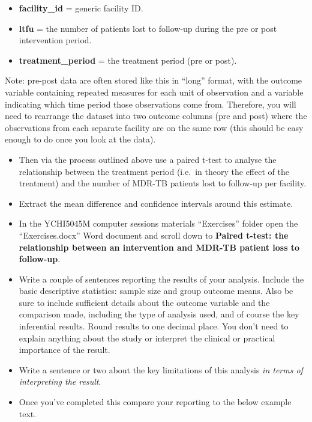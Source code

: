 \documentclass[
]{book}
\begin{document}
\begin{itemize}
\item
  \textbf{facility\_id} = generic facility ID.
\item
  \textbf{ltfu} = the number of patients lost to follow-up during the pre or post intervention period.
\item
  \textbf{treatment\_period} = the treatment period (pre or post).
\end{itemize}

Note: pre-post data are often stored like this in ``long'' format, with the outcome variable containing repeated measures for each unit of observation and a variable indicating which time period those observations come from. Therefore, you will need to rearrange the dataset into two outcome columns (pre and post) where the observations from each separate facility are on the same row (this should be easy enough to do once you look at the data).

\begin{itemize}
\item
  Then via the process outlined above use a paired t-test to analyse the relationship between the treatment period (i.e.~in theory the effect of the treatment) and the number of MDR-TB patients lost to follow-up per facility.
\item
  Extract the mean difference and confidence intervals around this estimate.
\item
  In the YCHI5045M computer sessions materials ``Exercises'' folder open the ``Exercises.docx'' Word document and scroll down to \textbf{Paired t-test: the relationship between an intervention and MDR-TB patient loss to follow-up}.
\item
  Write a couple of sentences reporting the results of your analysis. Include the basic descriptive statistics: sample size and group outcome means. Also be sure to include sufficient details about the outcome variable and the comparison made, including the type of analysis used, and of course the key inferential results. Round results to one decimal place. You don't need to explain anything about the study or interpret the clinical or practical importance of the result.
\item
  Write a sentence or two about the key limitations of this analysis \emph{in terms of interpreting the result}.
\item
  Once you've completed this compare your reporting to the below example text.
\end{itemize}
\end{document}
